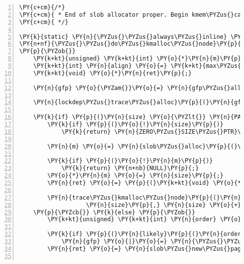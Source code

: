 \begin{Verbatim}[commandchars=\\\{\},numbers=left,firstnumber=1,stepnumber=1]
\PY{c+cm}{/*}
\PY{c+cm}{ * End of slob allocator proper. Begin kmem\PYZus{}cache\PYZus{}alloc and kmalloc frontend.}
\PY{c+cm}{ */}

\PY{k}{static} \PY{n}{\PYZus{}\PYZus{}always\PYZus{}inline} \PY{k+kt}{void} \PY{o}{*}
\PY{n+nf}{\PYZus{}\PYZus{}do\PYZus{}kmalloc\PYZus{}node}\PY{p}{(}\PY{k+kt}{size\PYZus{}t} \PY{n}{size}\PY{p}{,} \PY{k+kt}{gfp\PYZus{}t} \PY{n}{gfp}\PY{p}{,} \PY{k+kt}{int} \PY{n}{node}\PY{p}{,} \PY{k+kt}{unsigned} \PY{k+kt}{long} \PY{n}{caller}\PY{p}{)}
\PY{p}{\PYZob{}}
	\PY{k+kt}{unsigned} \PY{k+kt}{int} \PY{o}{*}\PY{n}{m}\PY{p}{;}
	\PY{k+kt}{int} \PY{n}{align} \PY{o}{=} \PY{k+kt}{max\PYZus{}t}\PY{p}{(}\PY{k+kt}{size\PYZus{}t}\PY{p}{,} \PY{n}{ARCH\PYZus{}KMALLOC\PYZus{}MINALIGN}\PY{p}{,} \PY{n}{ARCH\PYZus{}SLAB\PYZus{}MINALIGN}\PY{p}{)}\PY{p}{;}
	\PY{k+kt}{void} \PY{o}{*}\PY{n}{ret}\PY{p}{;}

	\PY{n}{gfp} \PY{o}{\PYZam{}}\PY{o}{=} \PY{n}{gfp\PYZus{}allowed\PYZus{}mask}\PY{p}{;}

	\PY{n}{lockdep\PYZus{}trace\PYZus{}alloc}\PY{p}{(}\PY{n}{gfp}\PY{p}{)}\PY{p}{;}

	\PY{k}{if} \PY{p}{(}\PY{n}{size} \PY{o}{\PYZlt{}} \PY{n}{PAGE\PYZus{}SIZE} \PY{o}{\PYZhy{}} \PY{n}{align}\PY{p}{)} \PY{p}{\PYZob{}}
		\PY{k}{if} \PY{p}{(}\PY{o}{!}\PY{n}{size}\PY{p}{)}
			\PY{k}{return} \PY{n}{ZERO\PYZus{}SIZE\PYZus{}PTR}\PY{p}{;}

		\PY{n}{m} \PY{o}{=} \PY{n}{slob\PYZus{}alloc}\PY{p}{(}\PY{n}{size} \PY{o}{+} \PY{n}{align}\PY{p}{,} \PY{n}{gfp}\PY{p}{,} \PY{n}{align}\PY{p}{,} \PY{n}{node}\PY{p}{)}\PY{p}{;}

		\PY{k}{if} \PY{p}{(}\PY{o}{!}\PY{n}{m}\PY{p}{)}
			\PY{k}{return} \PY{n+nb}{NULL}\PY{p}{;}
		\PY{o}{*}\PY{n}{m} \PY{o}{=} \PY{n}{size}\PY{p}{;}
		\PY{n}{ret} \PY{o}{=} \PY{p}{(}\PY{k+kt}{void} \PY{o}{*}\PY{p}{)}\PY{n}{m} \PY{o}{+} \PY{n}{align}\PY{p}{;}

		\PY{n}{trace\PYZus{}kmalloc\PYZus{}node}\PY{p}{(}\PY{n}{caller}\PY{p}{,} \PY{n}{ret}\PY{p}{,}
				   \PY{n}{size}\PY{p}{,} \PY{n}{size} \PY{o}{+} \PY{n}{align}\PY{p}{,} \PY{n}{gfp}\PY{p}{,} \PY{n}{node}\PY{p}{)}\PY{p}{;}
	\PY{p}{\PYZcb{}} \PY{k}{else} \PY{p}{\PYZob{}}
		\PY{k+kt}{unsigned} \PY{k+kt}{int} \PY{n}{order} \PY{o}{=} \PY{n}{get\PYZus{}order}\PY{p}{(}\PY{n}{size}\PY{p}{)}\PY{p}{;}

		\PY{k}{if} \PY{p}{(}\PY{n}{likely}\PY{p}{(}\PY{n}{order}\PY{p}{)}\PY{p}{)}
			\PY{n}{gfp} \PY{o}{|}\PY{o}{=} \PY{n}{\PYZus{}\PYZus{}GFP\PYZus{}COMP}\PY{p}{;}
		\PY{n}{ret} \PY{o}{=} \PY{n}{slob\PYZus{}new\PYZus{}pages}\PY{p}{(}\PY{n}{gfp}\PY{p}{,} \PY{n}{order}\PY{p}{,} \PY{n}{node}\PY{p}{)}\PY{p}{;}


\end{Verbatim}
